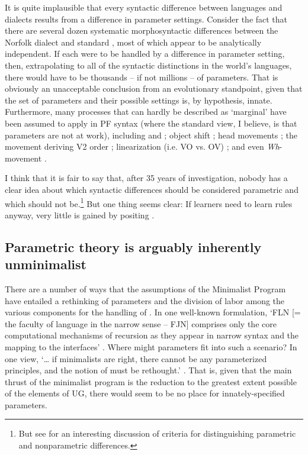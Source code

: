 \documentclass[output=paper,
modfonts
]{LSP/langsci}
\begin{document}
It is quite implausible that every syntactic difference between
languages and dialects results from a difference in parameter settings.
Consider the fact that there are several dozen systematic
morphosyntactic differences between the Norfolk dialect and standard
 \citep{trudgill2003}, most of which appear to be analytically
independent. If each were to be handled by a difference in parameter
setting, then, extrapolating to all of the syntactic distinctions in the
world's languages, there would have to be thousands  --  if not millions
 --  of parameters. That is obviously an unacceptable conclusion from an
evolutionary standpoint, given that the set of parameters and their
possible settings is, by hypothesis, innate. Furthermore, many processes
that can hardly be described as `marginal' have been assumed to apply in
PF syntax (where the standard view, I believe, is that parameters are
not at work), including  and  \citep{chomsky1995};
object shift \citep{holmberg1999,erteschik-shir2005}; head movements
\citep{boeckx2001}; the movement deriving V2 order \citep{chomsky2001b}; linearization (i.e. VO vs. OV) \citep{chomsky1995,takano1996,fukui1998,uriagereka1999}; and even \emph{Wh}-movement
\citep{erteschik-shir2005}.

I think that it is fair to say that, after 35 years of investigation,
nobody has a clear idea about which syntactic differences should be
considered parametric and which should not be.\footnote{But see \citet{smith2009n} for an interesting discussion of criteria for
  distinguishing parametric and nonparametric differences.} But one
thing seems clear: If learners need to learn rules anyway, very little
is gained by positing .

\subsection{Parametric theory is arguably inherently unminimalist}

There are a number of ways that the assumptions of the Minimalist Program have entailed
a rethinking of parameters and the division of labor among the various
components for the handling of . In one well-known formulation,
`FLN {[}= the faculty of language in the narrow sense  --  FJN{]}
comprises only the core computational mechanisms of recursion as they
appear in narrow syntax and the mapping to the interfaces' \citep[1573]{hauser2002}. Where might parameters fit into such a
scenario? In one view, `\ldots{} if minimalists are right, there cannot
be any parameterized principles, and the notion of 
must be rethought.' \citep[206]{boeckx2011}. That is, given that the main
thrust of the minimalist program is the reduction to the greatest extent
possible of the elements of UG, there would seem to be no place for
innately-specified parameters.
\end{document}
